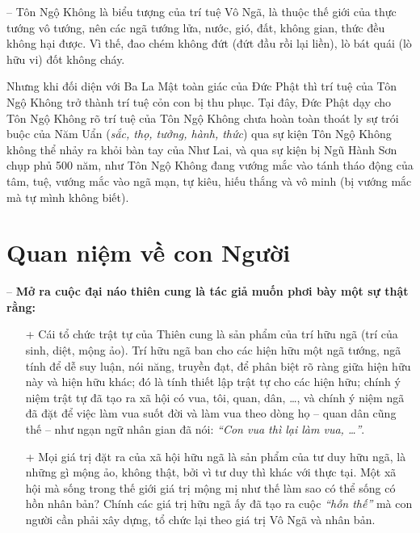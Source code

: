 -- Tôn Ngộ Không là biểu tượng của trí tuệ Vô Ngã, là thuộc thế giới của thực tướng vô tướng, nên các ngã tướng lửa, nước, gió, đất, không gian, thức đều không hại được. Vì thế, đao chém không đứt (đứt đầu rồi lại liền), lò bát quái (lò hữu vi) đốt không cháy.

Nhưng khi đối diện với Ba La Mật toàn giác của Đức Phật thì trí tuệ của Tôn Ngộ Không trở thành trí tuệ cỏn con bị thu phục. Tại đây, Đức Phật dạy cho Tôn Ngộ Không rõ trí tuệ của Tôn Ngộ Không chưa hoàn toàn thoát ly sự trói buộc của Năm Uẩn (\emph{sắc, thọ, tưởng, hành, thức}) qua sự kiện Tôn Ngộ Không không thể nhảy ra khỏi bàn tay của Như Lai, và qua sự kiện bị Ngũ Hành Sơn chụp phủ 500 năm, như Tôn Ngộ Không đang vướng mắc vào tánh tháo động của tâm, tuệ, vướng mắc vào ngã mạn, tự kiêu, hiếu thắng và vô minh (bị vướng mắc mà tự mình không biết).


\section{Quan niệm về con Người} %
\label{sec:4_con_nguoi}

-- {\bf Mở ra cuộc đại náo thiên cung là tác giả muốn phơi bày một sự thật rằng:}

\begin{enumerate}[label=\itshape\alph*\upshape/]

    \item[+] Cái tổ chức trật tự của Thiên cung là sản phẩm của trí hữu ngã (trí của sinh, diệt, mộng ảo). Trí hữu ngã ban cho các hiện hữu một ngã tướng, ngã tính để dễ suy luận, nói năng, truyền đạt, để phân biệt rõ ràng giữa hiện hữu này và hiện hữu khác; đó là tính thiết lập trật tự cho các hiện hữu; chính ý niệm trật tự đã tạo ra xã hội có vua, tôi, quan, dân, \ldots, và chính ý niệm ngã đã đặt để việc làm vua suốt đời và làm vua theo dòng họ -- quan dân cũng thế -- như ngạn ngữ nhân gian đã nói: \emph{``Con vua thì lại làm vua, \ldots''}.

    \item[+] Mọi giá trị đặt ra của xã hội hữu ngã là sản phẩm của tư duy hữu ngã, là những gì mộng ảo, không thật, bởi vì tư duy thì khác với thực tại. Một xã hội mà sống trong thế giới giá trị mộng mị như thế làm sao có thể sống có hồn nhân bản? Chính các giá trị hữu ngã ấy đã tạo ra cuộc \emph{``hỗn thế''} mà con người cần phải xây dựng, tổ chức lại theo giá trị Vô Ngã và nhân bản.
\end{enumerate}

